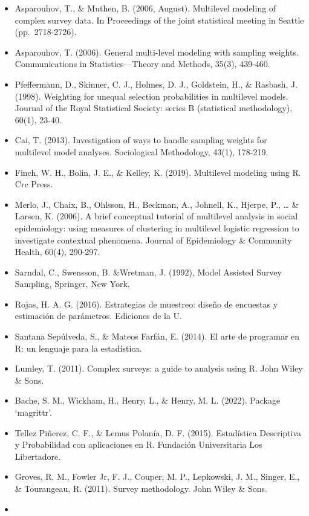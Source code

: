 \documentclass[
  12pt,
]{book}
\begin{document}
\begin{itemize}
\item
  Asparouhov, T., \& Muthen, B. (2006, August). Multilevel modeling of complex survey data. In Proceedings of the joint statistical meeting in Seattle (pp.~2718-2726).
\item
  Asparouhov, T. (2006). General multi-level modeling with sampling weights. Communications in Statistics---Theory and Methods, 35(3), 439-460.
\item
  Pfeffermann, D., Skinner, C. J., Holmes, D. J., Goldstein, H., \& Rasbash, J. (1998). Weighting for unequal selection probabilities in multilevel models. Journal of the Royal Statistical Society: series B (statistical methodology), 60(1), 23-40.
\item
  Cai, T. (2013). Investigation of ways to handle sampling weights for multilevel model analyses. Sociological Methodology, 43(1), 178-219.
\item
  Finch, W. H., Bolin, J. E., \& Kelley, K. (2019). Multilevel modeling using R. Crc Press.
\item
  Merlo, J., Chaix, B., Ohlsson, H., Beckman, A., Johnell, K., Hjerpe, P., \ldots{} \& Larsen, K. (2006). A brief conceptual tutorial of multilevel analysis in social epidemiology: using measures of clustering in multilevel logistic regression to investigate contextual phenomena. Journal of Epidemiology \& Community Health, 60(4), 290-297.
\item
  Sarndal, C., Swensson, B. \&Wretman, J. (1992), Model Assisted Survey Sampling, Springer, New York.
\item
  Rojas, H. A. G. (2016). Estrategias de muestreo: diseño de encuestas y estimación de parámetros. Ediciones de la U.
\item
  Santana Sepúlveda, S., \& Mateos Farfán, E. (2014). El arte de programar en R: un lenguaje para la estadística.
\item
  Lumley, T. (2011). Complex surveys: a guide to analysis using R. John Wiley \& Sons.
\item
  Bache, S. M., Wickham, H., Henry, L., \& Henry, M. L. (2022). Package `magrittr'.
\item
  Tellez Piñerez, C. F., \& Lemus Polanía, D. F. (2015). Estadística Descriptiva y Probabilidad con aplicaciones en R. Fundación Universitaria Los Libertadore.
\item
  Groves, R. M., Fowler Jr, F. J., Couper, M. P., Lepkowski, J. M., Singer, E., \& Tourangeau, R. (2011). Survey methodology. John Wiley \& Sons.
\item

\end{itemize}
\end{document}
